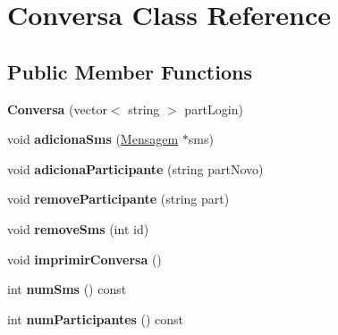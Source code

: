\hypertarget{class_conversa}{}\section{Conversa Class Reference}
\label{class_conversa}
\subsection*{Public Member Functions}
\begin{DoxyCompactItemize}
\item 
\hypertarget{class_conversa_a00aae9cbb21f271ac1d6ba578ca820ec}{}{\bfseries Conversa} (vector$<$ string $>$ part\+Login)\label{class_conversa_a00aae9cbb21f271ac1d6ba578ca820ec}

\item 
\hypertarget{class_conversa_aee6541eeaa269a26b14e7d5170ab82e0}{}void {\bfseries adiciona\+Sms} (\hyperlink{class_mensagem}{Mensagem} $\ast$sms)\label{class_conversa_aee6541eeaa269a26b14e7d5170ab82e0}

\item 
\hypertarget{class_conversa_ab7e050856c96cc40bd6dd16044b167cb}{}void {\bfseries adiciona\+Participante} (string part\+Novo)\label{class_conversa_ab7e050856c96cc40bd6dd16044b167cb}

\item 
\hypertarget{class_conversa_adfa90ab666242fc6079cc847be1396e2}{}void {\bfseries remove\+Participante} (string part)\label{class_conversa_adfa90ab666242fc6079cc847be1396e2}

\item 
\hypertarget{class_conversa_a85952428a550fe77c42347b487624027}{}void {\bfseries remove\+Sms} (int id)\label{class_conversa_a85952428a550fe77c42347b487624027}

\item 
\hypertarget{class_conversa_a9bb99c60f68841f6a7a01c1c68db15df}{}void {\bfseries imprimir\+Conversa} ()\label{class_conversa_a9bb99c60f68841f6a7a01c1c68db15df}

\item 
\hypertarget{class_conversa_a35b1035a3f780e63963dc11d8cc9fcb8}{}int {\bfseries num\+Sms} () const \label{class_conversa_a35b1035a3f780e63963dc11d8cc9fcb8}

\item 
\hypertarget{class_conversa_ae206bbcfb7fe25d6cbca2a7dc9266b0e}{}int {\bfseries num\+Participantes} () const \label{class_conversa_ae206bbcfb7fe25d6cbca2a7dc9266b0e}


\end{DoxyCompactItemize}
